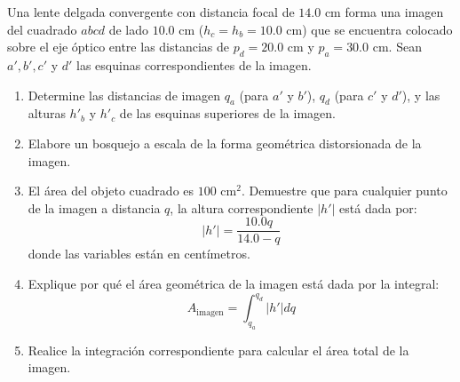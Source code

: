 \item Una lente delgada convergente con distancia focal de $14.0\text{ cm}$ forma una imagen del cuadrado $abcd$ de lado $10.0\text{ cm}$ ($h_c = h_b = 10.0\text{ cm}$) que se encuentra colocado sobre el eje óptico entre las distancias de $p_d = 20.0\text{ cm}$ y $p_a = 30.0\text{ cm}$. Sean $a', b', c'$ y $d'$ las esquinas correspondientes de la imagen.
\begin{enumerate}
    \item Determine las distancias de imagen $q_a$ (para $a'$ y $b'$), $q_d$ (para $c'$ y $d'$), y las alturas $h'_b$ y $h'_c$ de las esquinas superiores de la imagen.
    \item Elabore un bosquejo a escala de la forma geométrica distorsionada de la imagen.
    \item El área del objeto cuadrado es $100\text{ cm}^2$. Demuestre que para cualquier punto de la imagen a distancia $q$, la altura correspondiente $|h'|$ está dada por:
    $$ |h'| = \frac{10.0 q}{14.0 - q} $$
    donde las variables están en centímetros.
    \item Explique por qué el área geométrica de la imagen está dada por la integral:
    $$ A_{\text{imagen}} = \int_{q_a}^{q_d} |h'| dq $$
    \item Realice la integración correspondiente para calcular el área total de la imagen.
\end{enumerate}